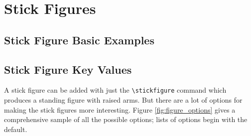 \documentclass[twoside,12pt]{article}
\begin{document}

\clearpage

\section{Stick Figures}
\subsection{Stick Figure Basic Examples}

\subsection{Stick Figure Key Values}

A stick figure can be added with just the \verb|\stickfigure| command which produces a standing figure with raised arms.  But there are a lot of options for making the stick figures more interesting. Figure \ref{fig:figure_options} gives a comprehensive sample of all the possible options; lists of options begin with the default. 
\end{document}
